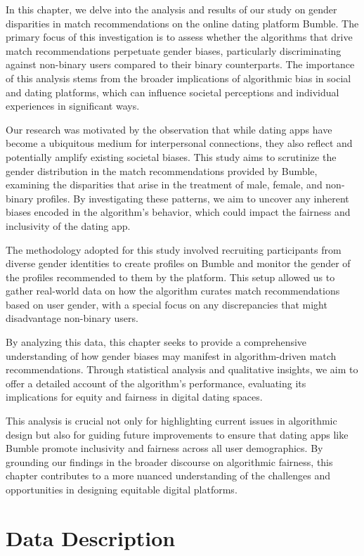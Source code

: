 In this chapter, we delve into the analysis and results of our study on gender disparities in match recommendations on the online dating platform Bumble. The primary focus of this investigation is to assess whether the algorithms that drive match recommendations perpetuate gender biases, particularly discriminating against non-binary users compared to their binary counterparts. The importance of this analysis stems from the broader implications of algorithmic bias in social and dating platforms, which can influence societal perceptions and individual experiences in significant ways.

Our research was motivated by the observation that while dating apps have become a ubiquitous medium for interpersonal connections, they also reflect and potentially amplify existing societal biases. This study aims to scrutinize the gender distribution in the match recommendations provided by Bumble, examining the disparities that arise in the treatment of male, female, and non-binary profiles. By investigating these patterns, we aim to uncover any inherent biases encoded in the algorithm's behavior, which could impact the fairness and inclusivity of the dating app.

The methodology adopted for this study involved recruiting participants from diverse gender identities to create profiles on Bumble and monitor the gender of the profiles recommended to them by the platform. This setup allowed us to gather real-world data on how the algorithm curates match recommendations based on user gender, with a special focus on any discrepancies that might disadvantage non-binary users.

By analyzing this data, this chapter seeks to provide a comprehensive understanding of how gender biases may manifest in algorithm-driven match recommendations. Through statistical analysis and qualitative insights, we aim to offer a detailed account of the algorithm’s performance, evaluating its implications for equity and fairness in digital dating spaces.

This analysis is crucial not only for highlighting current issues in algorithmic design but also for guiding future improvements to ensure that dating apps like Bumble promote inclusivity and fairness across all user demographics. By grounding our findings in the broader discourse on algorithmic fairness, this chapter contributes to a more nuanced understanding of the challenges and opportunities in designing equitable digital platforms.

\section{Data Description}

